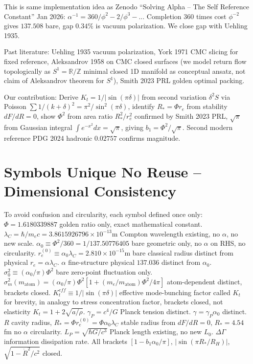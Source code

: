 \documentclass[11pt,a4paper]{article}
\begin{document}
This is same implementation idea as Zenodo ``Solving Alpha -- The Self Reference Constant'' Jan 2026: $\alpha^{-1}=360/\phi^2-2/\phi^3-...$ Completion $360$ times cost $\phi^{-2}$ gives $137.508$ bare, gap $0.34\%$ is vacuum polarization. We close gap with Uehling 1935.

Past literature: Uehling 1935 vacuum polarization, York 1971 CMC slicing for fixed reference, Aleksandrov 1958 on CMC closed surfaces (we model return flow topologically as $S^1=\mathbb{R}/\mathbb{Z}$ minimal closed 1D manifold as conceptual ansatz, not claim of Aleksandrov theorem for $S^1$), Smith 2023 PRL golden optimal packing.

Our contribution: Derive $K_t=1/|\sin(\pi\delta)|$ from second variation $\delta^2S$ via Poisson $\sum1/(k+\delta)^2=\pi^2/\sin^2(\pi\delta)$, identify $R_*=\Phi r_e$ from stability $dF/dR=0$, show $\Phi^2$ from area ratio $R_*^2/r_e^2$ confirmed by Smith 2023 PRL, $\sqrt{\pi}$ from Gaussian integral $\int e^{-x^2}dx=\sqrt{\pi}$, giving $b_1=\Phi^2/\sqrt{\pi}$. Second modern reference PDG 2024 hadronic $0.02757$ confirms magnitude.

\section{Symbols Unique No Reuse -- Dimensional Consistency}
To avoid confusion and circularity, each symbol defined once only:
$\Phi=1.6180339887$ golden ratio only, exact mathematical constant.
$\lambda_C=\hbar/m_ec=3.8615926796\times10^{-13}$m Compton wavelength existing, no $\alpha$, no new scale.
$\alpha_0\equiv\Phi^2/360=1/137.50776405$ bare geometric only, no $\alpha$ on RHS, no circularity.
$r_e^{(0)}\equiv\alpha_0\lambda_C=2.810\times10^{-15}$m bare classical radius distinct from physical $r_e=\alpha\lambda_C$.
$\alpha$ fine-structure physical $137.036$ distinct from $\alpha_0$.
$\sigma_0^2\equiv(\alpha_0/\pi)\Phi^2$ bare zero-point fluctuation only.
$\sigma_m^2(m_{\text{atom}})=(\alpha_0/\pi)\Phi^2[1+(m_e/m_{\text{atom}})\Phi^2/4\pi]$ atom-dependent distinct, brackets closed.
$K_t^{eff}\equiv1/|\sin(\pi\delta)|$ effective mode-bunching factor called $K_t$ for brevity, in analogy to stress concentration factor, brackets closed, not elasticity $K_t=1+2\sqrt{a/\rho}$.
$\gamma_P=c^4/G$ Planck tension distinct.
$\gamma=\gamma_P\alpha_0$ distinct.
$R$ cavity radius, $R_*=\Phi r_e^{(0)}=\Phi\alpha_0\lambda_C$ stable radius from $dF/dR=0$, $R_*=4.54$fm no $\alpha$ circularity.
$L_P=\sqrt{\hbar G/c^3}$ Planck length existing, no new $L_0$.
$\Delta\Gamma$ information dissipation rate.
All brackets $\left[1-b_1\alpha_0/\pi\right]$, $\left|\sin(\pi R_*/R_H)\right|$, $\sqrt{1-\dot R^2/c^2}$ closed.
\end{document}
